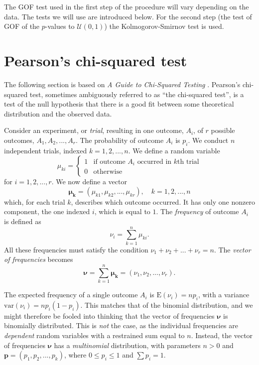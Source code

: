 The GOF test used in the first step of the procedure will vary depending on the data. The tests we will use are introduced below. For the second step (the test of GOF of the $p$-values to $\mathcal{U}(0, 1)$) the Kolmogorov-Smirnov test is used.



\section{Pearson's chi-squared test\label{sec:chi}}

The following section is based on \emph{A Guide to Chi-Squared Testing} .
Pearson's chi-squared test, sometimes ambiguously referred to as ``the chi-squared test'', is a test of the null hypothesis that there is a good fit between some theoretical distribution and the observed data.

Consider an experiment, or \emph{trial}, resulting in one outcome, $A_i\label{eq:Ai}$, of $r\label{eq:r}$ possible outcomes, $A_1, A_2, ..., A_r$. The probability of outcome $A_i$ is $p_i$. We conduct $n\label{eq:n}$ independent trials, indexed $k = 1, 2, ..., n$. We define a random variable 
\begin{equation}
\mu_{ki} = 
\begin{cases}
	1 & \text{if outcome $A_i$ occurred in $k$th trial}\\
	0 & \text{otherwise}
\end{cases}
\end{equation}
for $i = 1, 2, ..., r$. We now define a vector
\begin{equation}
\bm{\mu_k} = (\mu_{k1}, \mu_{k2}, ..., \mu_{kr}),     \quad k = 1, 2, ..., n
\end{equation}
which, for each trial $k$, describes which outcome occurred. It has only one nonzero component, the one indexed $i$, which is equal to $1$. The \emph{frequency} of outcome $A_i$ is defined as
\begin{equation}\label{eq:nui}
\nu_i = \sum_{k=1}^n{\mu_{ki}}.
\end{equation}
All these frequencies must satisfy the condition $\nu_1 + \nu_2 + ... + \nu_r = n$. The \emph{vector of frequencies} becomes
\begin{equation}\label{eq:freqvector}
\bm{\nu} = \sum_{k=1}^n{\bm{\mu_k}} = (\nu_1, \nu_2, ..., \nu_r).
\end{equation}

The expected frequency of a single outcome $A_i$ is $\text{E}(\nu_i) = np_i\label{eq:expfreq}$, with a variance $\text{var}(\nu_i) = np_i(1-p_i)$. This matches that of the binomial distribution, and we might therefore be fooled into thinking that the vector of frequencies $\bm{\nu}$ is binomially distributed. This is \emph{not} the case, as the individual frequencies are \emph{dependent} random variables with a restrained sum equal to $n$. Instead, the vector of frequencies $\bm{\nu}$ has a \emph{multinomial} distribution, with parameters $n > 0$ and $\bm{p} = (p_1, p_2, ..., p_k)\label{eq:pvec}$, where $0 \le p_i \le 1$ and $\sum p_i = 1$.

